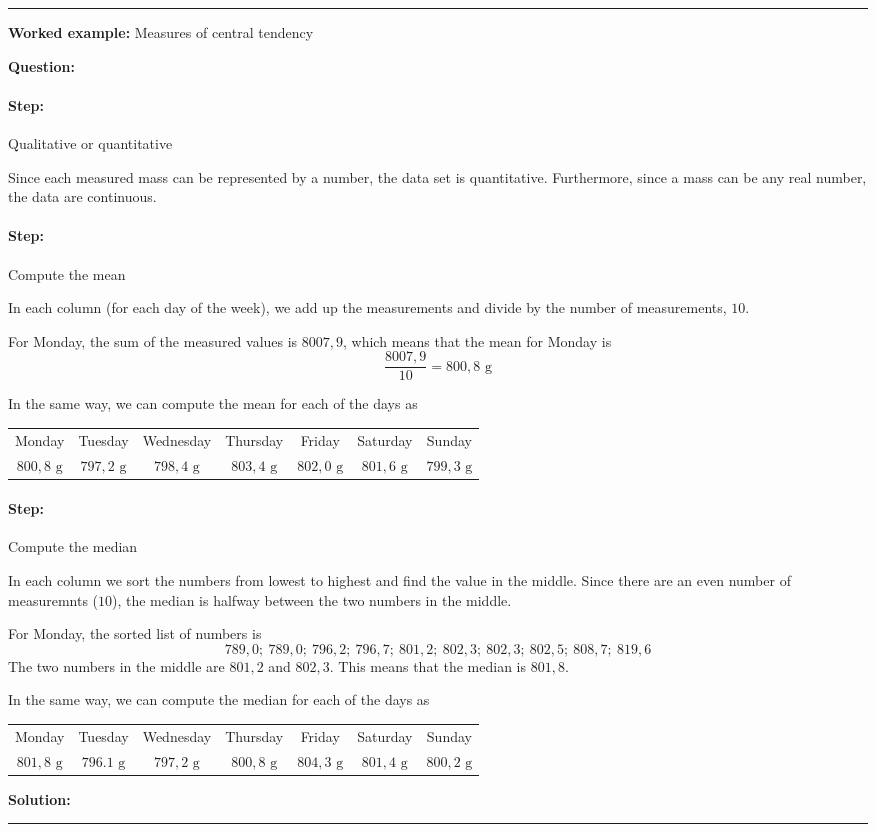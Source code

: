 \documentclass[a4paper,11pt]{report}
\newenvironment{wex}[3]%
{\rule{\linewidth}{0.5mm}
\textbf{Worked example:} #1

\textbf{Question:} #2

\textbf{Solution:} #3}%
{\rule{\linewidth}{0.5mm}}
\newcommand{\westep}[1]{\paragraph{Step:} #1}
\begin{document}
\begin{wex}{Measures of central tendency}
{  \westep{Qualitative or quantitative}

  Since each measured mass can be represented by a number, the data
  set is quantitative. Furthermore, since a mass can be any real
  number, the data are continuous.

  \westep{Compute the mean}

  In each column (for each day of the week), we add up the
  measurements and divide by the number of measurements, $10$.

  For Monday, the sum of the measured values is $8007,9$, which means
  that the mean for Monday is
  \begin{equation}
    \frac{8007,9}{10} = 800,8\textrm{ g}
  \end{equation}

  In the same way, we can compute the mean for each of the days as

  \begin{center}
    \begin{tabular}{ccccccc}
      \toprule
      Monday & Tuesday & Wednesday & Thursday & Friday & Saturday & Sunday \\
      $800,8\textrm{ g}$ & $797,2\textrm{ g}$ & $798,4\textrm{ g}$ &
      $803,4\textrm{ g}$ & $802,0\textrm{ g}$ & $801,6\textrm{ g}$ &
      $799,3\textrm{ g}$ \\
      \bottomrule
    \end{tabular}
  \end{center}

  \westep{Compute the median}

  In each column we sort the numbers from lowest to highest and find
  the value in the middle. Since there are an even number of
  measuremnts ($10$), the median is halfway between the two numbers in
  the middle.

  For Monday, the sorted list of numbers is
  \[789,0;\ 789,0;\ 796,2;\ 796,7;\ 801,2;\ 802,3;\ 802,3;\ 802,5;\ 808,7;\ 819,6\]
  The two numbers in the middle are $801,2$ and $802,3$. This means
  that the median is $801,8$.

  In the same way, we can compute the median for each of the days as

  \begin{center}
    \begin{tabular}{ccccccc}
      \toprule
      Monday & Tuesday & Wednesday & Thursday & Friday & Saturday & Sunday \\
      $801,8\textrm{ g}$ & $796.1\textrm{ g}$ & $797,2\textrm{ g}$ & $800,8\textrm{ g}$ & $804,3\textrm{ g}$ & $801,4\textrm{ g}$ & $800,2\textrm{ g}$ \\
      \bottomrule
    \end{tabular}
  \end{center}

}
\end{wex}
\end{document}
